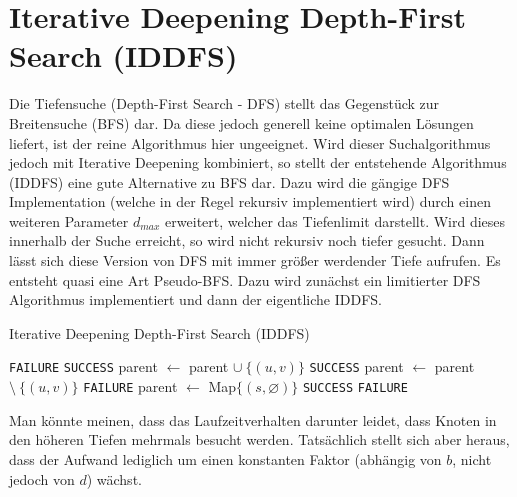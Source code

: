 \documentclass{whswinvcbook}
\begin{document}
\section{Iterative Deepening Depth-First Search (IDDFS)}
Die Tiefensuche (Depth-First Search - DFS) stellt das Gegenstück zur Breitensuche (BFS) dar. Da diese jedoch generell keine optimalen Lösungen liefert, ist der reine Algorithmus hier ungeeignet. Wird dieser Suchalgorithmus jedoch mit Iterative Deepening kombiniert, so stellt der entstehende Algorithmus (IDDFS) eine gute Alternative zu BFS dar. Dazu wird die gängige DFS Implementation (welche in der Regel rekursiv implementiert wird) durch einen weiteren Parameter $d_{max}$ erweitert, welcher das Tiefenlimit darstellt. Wird dieses innerhalb der Suche erreicht, so wird nicht rekursiv noch tiefer gesucht. Dann lässt sich diese Version von DFS mit immer größer werdender Tiefe aufrufen. Es entsteht quasi eine Art Pseudo-BFS. Dazu wird zunächst ein limitierter DFS Algorithmus implementiert und dann der eigentliche IDDFS.
\begin{algorithm}[H]
    \caption{Iterative Deepening Depth-First Search (IDDFS)}\label{alg-iddfs}
    \begin{algorithmic}[1]
                \State \Return \texttt{FAILURE}
            \EndIf
                \State \Return \texttt{SUCCESS}
            \EndIf
                    \State parent $\gets$ parent $\cup\:\{(u,v)\}$
                        \State \Return \texttt{SUCCESS}
                    \EndIf
                    \State parent $\gets$ parent $\setminus\:\{(u,v)\}$
                \EndIf
            \EndFor
            \State \Return \texttt{FAILURE}
        \EndFunction
            \State parent $\gets$ Map$\{(s,\varnothing)\}$
                    \State \Return \texttt{SUCCESS}
                \EndIf
            \EndFor
            \State \Return \texttt{FAILURE}
        \EndFunction
    \end{algorithmic}
\end{algorithm}
Man könnte meinen, dass das Laufzeitverhalten darunter leidet, dass Knoten in den höheren Tiefen mehrmals besucht werden. Tatsächlich stellt sich aber heraus, dass der Aufwand lediglich um einen konstanten Faktor (abhängig von $b$, nicht jedoch von $d$) wächst.\cite{ai}
\end{document}
